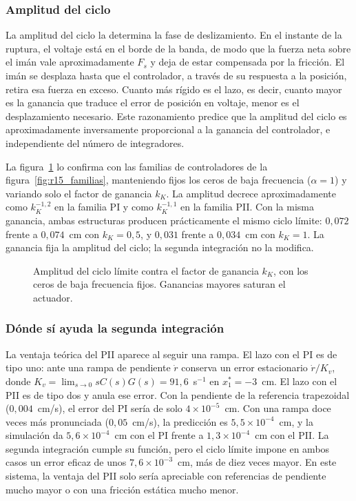 \subsubsection{Amplitud del ciclo}

La amplitud del ciclo la determina la fase de deslizamiento. En el instante de la ruptura, el voltaje está en el borde de la banda, de modo que la fuerza neta sobre el imán vale aproximadamente $F_s$ y deja de estar compensada por la fricción. El imán se desplaza hasta que el controlador, a través de su respuesta a la posición, retira esa fuerza en exceso. Cuanto más rígido es el lazo, es decir, cuanto mayor es la ganancia que traduce el error de posición en voltaje, menor es el desplazamiento necesario. Este razonamiento predice que la amplitud del ciclo es aproximadamente inversamente proporcional a la ganancia del controlador, e independiente del número de integradores.

La figura~\ref{fig:ganancia} lo confirma con las familias de controladores de la figura~\ref{fig:r15_familias}, manteniendo fijos los ceros de baja frecuencia ($\alpha=1$) y variando solo el factor de ganancia $k_K$. La amplitud decrece aproximadamente como $k_K^{-1{,}2}$ en la familia PI y como $k_K^{-1{,}1}$ en la familia PII. Con la misma ganancia, ambas estructuras producen prácticamente el mismo ciclo límite: $0{,}072$ frente a $0{,}074$~cm con $k_K=0{,}5$, y $0{,}031$ frente a $0{,}034$~cm con $k_K=1$. La ganancia fija la amplitud del ciclo; la segunda integración no la modifica.

\begin{figure}[ht]
    \centering
    
    \caption[Ciclo límite contra la ganancia]{Amplitud del ciclo límite contra el factor de ganancia $k_K$, con los ceros de baja frecuencia fijos. Ganancias mayores saturan el actuador.}
    \label{fig:ganancia}
\end{figure}

\subsubsection{Dónde sí ayuda la segunda integración}

La ventaja teórica del PII aparece al seguir una rampa. El lazo con el PI es de tipo uno: ante una rampa de pendiente $\dot r$ conserva un error estacionario $\dot r/K_v$, donde $K_v=\lim_{s\to0} sC(s)G(s)=91{,}6$~s$^{-1}$ en $x_1^*=-3$~cm. El lazo con el PII es de tipo dos y anula ese error. Con la pendiente de la referencia trapezoidal ($0{,}004$~cm/s), el error del PI sería de solo $4\times10^{-5}$~cm. Con una rampa doce veces más pronunciada ($0{,}05$~cm/s), la predicción es $5{,}5\times10^{-4}$~cm, y la simulación da $5{,}6\times10^{-4}$~cm con el PI frente a $1{,}3\times10^{-4}$~cm con el PII. La segunda integración cumple su función, pero el ciclo límite impone en ambos casos un error eficaz de unos $7{,}6\times10^{-3}$~cm, más de diez veces mayor. En este sistema, la ventaja del PII solo sería apreciable con referencias de pendiente mucho mayor o con una fricción estática mucho menor.

